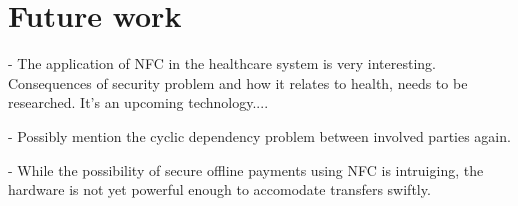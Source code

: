 \section{Future work}
\label{chap:future_work}

- The application of NFC in the healthcare system is very interesting. Consequences of security problem and how it relates to health, needs to be researched. It's an upcoming technology....

- Possibly mention the cyclic dependency problem between involved parties again.

- While the possibility of secure offline payments using NFC is intruiging, the hardware is not yet powerful enough to accomodate transfers swiftly.
